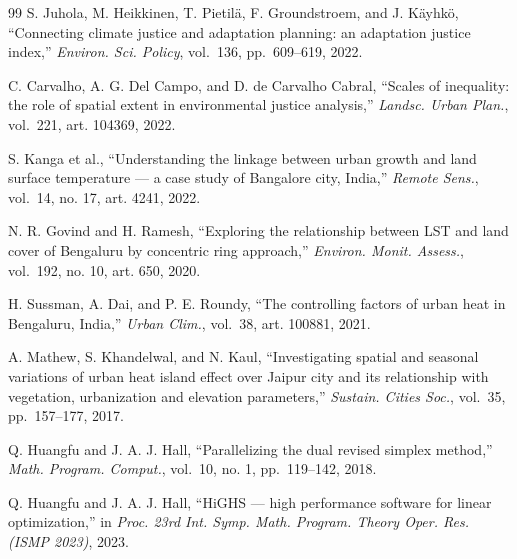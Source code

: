 \begin{thebibliography}{99}
 S. Juhola, M. Heikkinen, T. Pietilä, F. Groundstroem, and J. Käyhkö, ``Connecting climate justice
and adaptation planning: an adaptation justice index,'' \emph{Environ. Sci. Policy}, vol.~136, pp.~609--619,
2022.


 C. Carvalho, A. G. Del Campo, and D. de Carvalho Cabral, ``Scales of inequality: the role of spatial
extent in environmental justice analysis,'' \emph{Landsc. Urban Plan.}, vol.~221, art. 104369, 2022.


 S. Kanga et al., ``Understanding the linkage between urban growth and land surface temperature ---
a case study of Bangalore city, India,'' \emph{Remote Sens.}, vol.~14, no. 17, art. 4241, 2022.


 N. R. Govind and H. Ramesh, ``Exploring the relationship between LST and land cover of Bengaluru by
concentric ring approach,'' \emph{Environ. Monit. Assess.}, vol.~192, no. 10, art. 650, 2020.


 H. Sussman, A. Dai, and P. E. Roundy, ``The controlling factors of urban heat in Bengaluru,
India,'' \emph{Urban Clim.}, vol.~38, art. 100881, 2021.


 A. Mathew, S. Khandelwal, and N. Kaul, ``Investigating spatial and seasonal variations of urban
heat island effect over Jaipur city and its relationship with vegetation, urbanization and elevation
parameters,'' \emph{Sustain. Cities Soc.}, vol.~35, pp.~157--177, 2017.


 Q. Huangfu and J. A. J. Hall, ``Parallelizing the dual revised simplex method,'' \emph{Math. Program.
Comput.}, vol.~10, no. 1, pp.~119--142, 2018.


 Q. Huangfu and J. A. J. Hall, ``HiGHS --- high performance software for linear optimization,'' in
\emph{Proc. 23rd Int. Symp. Math. Program. Theory Oper. Res. (ISMP 2023)}, 2023.
\end{thebibliography}
